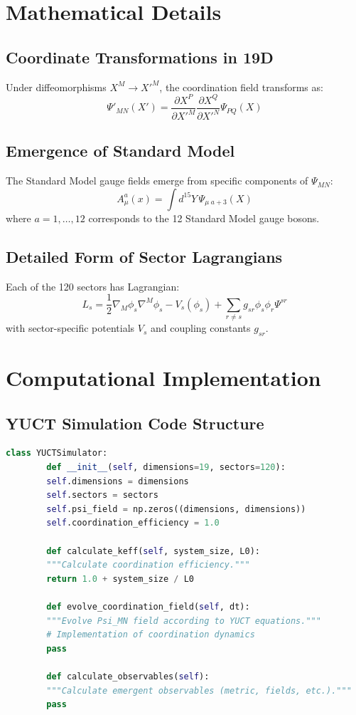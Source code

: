 \documentclass[12pt,a4paper]{article}
\theoremstyle{remark}
\begin{document}
	\appendix
	\section{Mathematical Details}
	\label{app:math-details}
	
	\subsection{Coordinate Transformations in 19D}
	
	Under diffeomorphisms $X^M \to X'^M$, the coordination field transforms as:
	\[
	\Psi'_{MN}(X') = \frac{\partial X^P}{\partial X'^M} \frac{\partial X^Q}{\partial X'^N} \Psi_{PQ}(X)
	\]
	
	\subsection{Emergence of Standard Model}
	
	The Standard Model gauge fields emerge from specific components of $\Psi_{MN}$:
	\[
	A_\mu^a(x) = \int d^{15}Y \, \Psi_{\mu\;a+3}(X)
	\]
	where $a=1,\dots,12$ corresponds to the 12 Standard Model gauge bosons.
	
	\subsection{Detailed Form of Sector Lagrangians}
	
	Each of the 120 sectors has Lagrangian:
	\[
	L_s = \frac{1}{2} \nabla_M \phi_s \nabla^M \phi_s - V_s(\phi_s) + \sum_{r \neq s} g_{sr} \phi_s \phi_r \Psi^{sr}
	\]
	with sector-specific potentials $V_s$ and coupling constants $g_{sr}$.
	
	\section{Computational Implementation}
	\label{app:computational}
	
	\subsection{YUCT Simulation Code Structure}
	
	\begin{lstlisting}[language=Python, caption={YUCT Simulation Framework}, label={lst:simulation}]
		class YUCTSimulator:
		def __init__(self, dimensions=19, sectors=120):
		self.dimensions = dimensions
		self.sectors = sectors
		self.psi_field = np.zeros((dimensions, dimensions))
		self.coordination_efficiency = 1.0
		
		def calculate_keff(self, system_size, L0):
		"""Calculate coordination efficiency."""
		return 1.0 + system_size / L0
		
		def evolve_coordination_field(self, dt):
		"""Evolve Psi_MN field according to YUCT equations."""
		# Implementation of coordination dynamics
		pass
		
		def calculate_observables(self):
		"""Calculate emergent observables (metric, fields, etc.)."""
		pass
	\end{lstlisting}
	
\end{document}
